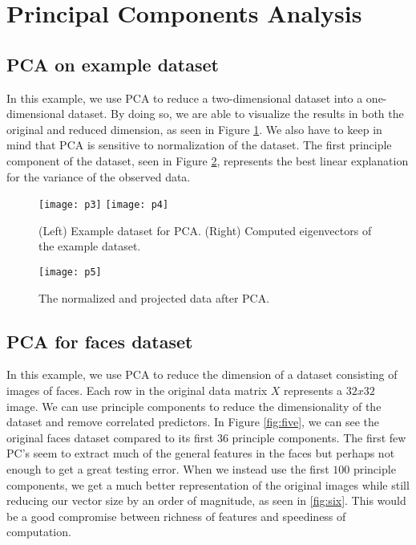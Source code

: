 \documentclass[oneside]{article}
\begin{document}
\section{Principal Components Analysis}

\subsection{PCA on example dataset}
In this example, we use PCA to reduce a two-dimensional dataset into a
one-dimensional dataset. By doing so, we are able to visualize the
results in both the original and reduced dimension, as seen in Figure
\ref{fig:three}. We also have to keep in mind that PCA is sensitive to
normalization of the dataset. The first principle component of the
dataset, seen in Figure \ref{fig:four}, represents the best linear
explanation for the variance of the observed data.

\begin{figure}[hbtp]
  \centering
  \texttt{[image: p3]}
  \texttt{[image: p4]}
  \caption{(Left) Example dataset for PCA. (Right) Computed
    eigenvectors of the example dataset.}
  \label{fig:three}
\end{figure}

\begin{figure}[hbtp]
  \centering
  \texttt{[image: p5]}
  \caption{The normalized and projected data after PCA.}
  \label{fig:four}
\end{figure}

\subsection{PCA for faces dataset}
In this example, we use PCA to reduce the dimension of a dataset
consisting of images of faces. Each row in the original data matrix
$X$ represents a $32 x 32$ image. We can use principle components to
reduce the dimensionality of the dataset and remove correlated
predictors. In Figure \ref{fig:five}, we can see the original faces
dataset compared to its first $36$ principle components. The first few
PC's seem to extract much of the general features in the faces but
perhaps not enough to get a great testing error. When we instead use
the first $100$ principle components, we get a much better
representation of the original images while still reducing our vector
size by an order of magnitude, as seen in \ref{fig:six}. This would be
a good compromise between richness of features and speediness of
computation.
\end{document}

